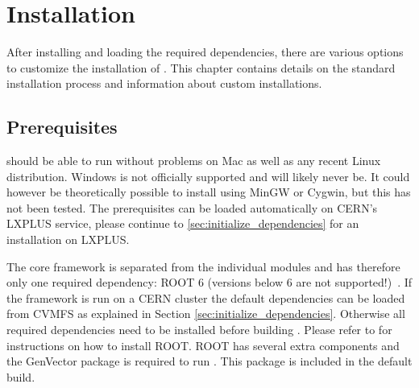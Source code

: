 \section{Installation}
\label{sec:installation}
After installing and loading the required dependencies, there are various options to customize the installation of \apsq. This chapter contains details on the standard installation process and information about custom installations.

\subsection{Prerequisites}
\label{sec:prerequisites}
\apsq should be able to run without problems on Mac as well as any recent Linux distribution. Windows is not officially supported and will likely never be. It could however be theoretically possible to install \apsq using MinGW or Cygwin, but this has not been tested. The prerequisites can be loaded automatically on CERN's LXPLUS service, please continue to \ref{sec:initialize_dependencies} for an installation on LXPLUS.

The core framework is separated from the individual modules and \apsq has therefore only one required dependency: ROOT 6 (versions below 6 are not supported!)~\cite{root}. If the framework is run on a CERN cluster the default dependencies can be loaded from CVMFS as explained in Section \ref{sec:initialize_dependencies}. Otherwise all required dependencies need to be installed before building \apsq. Please refer to \cite{rootinstallation} for instructions on how to install ROOT. ROOT has several extra components and the GenVector package is required to run \apsq. This package is included in the default build.


